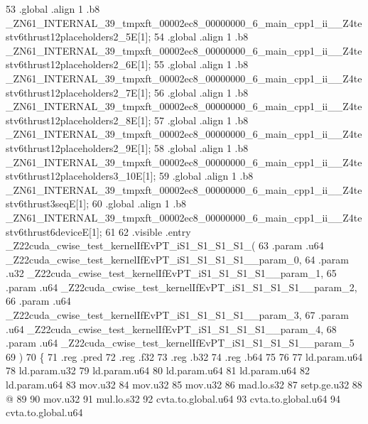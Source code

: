 \begin{DoxyCode}
53 .global .align 1 .b8
       \_ZN61\_INTERNAL\_39\_tmpxft\_00002ec8\_00000000\_6\_main\_cpp1\_ii\_\_Z4testv6thrust12placeholders2\_5E[1];
54 .global .align 1 .b8
       \_ZN61\_INTERNAL\_39\_tmpxft\_00002ec8\_00000000\_6\_main\_cpp1\_ii\_\_Z4testv6thrust12placeholders2\_6E[1];
55 .global .align 1 .b8
       \_ZN61\_INTERNAL\_39\_tmpxft\_00002ec8\_00000000\_6\_main\_cpp1\_ii\_\_Z4testv6thrust12placeholders2\_7E[1];
56 .global .align 1 .b8
       \_ZN61\_INTERNAL\_39\_tmpxft\_00002ec8\_00000000\_6\_main\_cpp1\_ii\_\_Z4testv6thrust12placeholders2\_8E[1];
57 .global .align 1 .b8
       \_ZN61\_INTERNAL\_39\_tmpxft\_00002ec8\_00000000\_6\_main\_cpp1\_ii\_\_Z4testv6thrust12placeholders2\_9E[1];
58 .global .align 1 .b8
       \_ZN61\_INTERNAL\_39\_tmpxft\_00002ec8\_00000000\_6\_main\_cpp1\_ii\_\_Z4testv6thrust12placeholders3\_10E[1];
59 .global .align 1 .b8 \_ZN61\_INTERNAL\_39\_tmpxft\_00002ec8\_00000000\_6\_main\_cpp1\_ii\_\_Z4testv6thrust3seqE[1];
60 .global .align 1 .b8 \_ZN61\_INTERNAL\_39\_tmpxft\_00002ec8\_00000000\_6\_main\_cpp1\_ii\_\_Z4testv6thrust6deviceE[1];
61 
62 .visible .entry \_Z22cuda\_cwise\_test\_kernelIfEvPT\_iS1\_S1\_S1\_S1\_(
63 .param .u64 \_Z22cuda\_cwise\_test\_kernelIfEvPT\_iS1\_S1\_S1\_S1\_\_param\_0,
64 .param .u32 \_Z22cuda\_cwise\_test\_kernelIfEvPT\_iS1\_S1\_S1\_S1\_\_param\_1,
65 .param .u64 \_Z22cuda\_cwise\_test\_kernelIfEvPT\_iS1\_S1\_S1\_S1\_\_param\_2,
66 .param .u64 \_Z22cuda\_cwise\_test\_kernelIfEvPT\_iS1\_S1\_S1\_S1\_\_param\_3,
67 .param .u64 \_Z22cuda\_cwise\_test\_kernelIfEvPT\_iS1\_S1\_S1\_S1\_\_param\_4,
68 .param .u64 \_Z22cuda\_cwise\_test\_kernelIfEvPT\_iS1\_S1\_S1\_S1\_\_param\_5
69 )
70 \{
71 .reg .pred %
72 .reg .f32 %
73 .reg .b32 %
74 .reg .b64 %
75 
76 
77 ld.param.u64 %
78 ld.param.u32 %
79 ld.param.u64 %
80 ld.param.u64 %
81 ld.param.u64 %
82 ld.param.u64 %
83 mov.u32 %
84 mov.u32 %
85 mov.u32 %
86 mad.lo.s32 %
87 setp.ge.u32 %
88 @%
89 
90 mov.u32 %
91 mul.lo.s32 %
92 cvta.to.global.u64 %
93 cvta.to.global.u64 %
94 cvta.to.global.u64 %

\end{DoxyCode}
